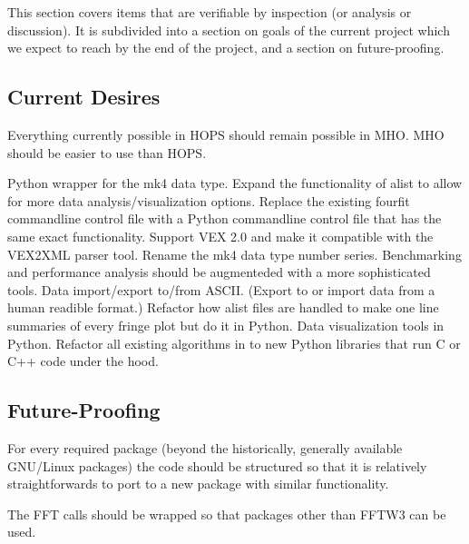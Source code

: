 This section covers items that are verifiable by inspection (or analysis
or discussion).  It is subdivided into a section on goals of the current
project which we expect to reach by the end of the project, and a section
on future-proofing.

\subsection{Current Desires}
\label{sec:currentdesires}

\begin{description}
 Everything currently possible in \ac{HOPS} should remain
possible in \ac{MHO}.
 \ac{MHO} should be easier to use than \ac{HOPS}.

 Python wrapper for the mk4 data type.
 Expand the functionality of alist to allow for more data
    analysis/visualization options.
 Replace the existing fourfit commandline control file with
    a Python commandline control file that has the same exact functionality.
 Support VEX 2.0 and make it compatible with the VEX2XML parser tool.
 Rename the mk4 data type number series.
 Benchmarking and performance analysis should be augmenteded
    with a more sophisticated tools.
 Data import/export to/from ASCII. (Export to or import data
    from a human readible format.)
 Refactor how alist files are handled to make one line
    summaries of every fringe plot but do it in Python.
 Data visualization tools in Python.
 Refactor all existing algorithms in to new Python libraries
    that run C or C++ code under the hood.
\end{description}

\subsection{Future-Proofing}
\label{sec:future}

For every required package (beyond the historically, generally
available \ac{GNU/Linux} packages) the code should be structured so
that it is relatively straightforwards to port to a new package with
similar functionality.

\begin{description}
 The \ac{FFT} calls should be wrapped so that packages other than
    \ac{FFTW3} can be used.
\end{description}

%
%
